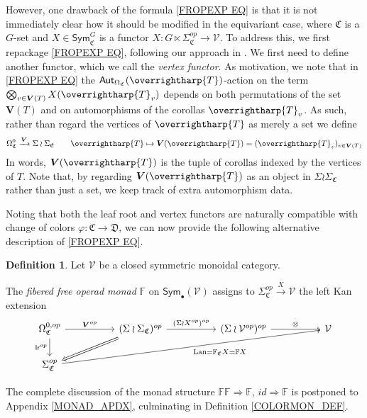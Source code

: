\documentclass[a4paper,10pt
,draft
]{article}%
\numberwithin{equation}{section}
\numberwithin{figure}{section}
\theoremstyle{definition} %
\newtheorem{definition}[equation]{Definition}%
\newcommand{\vect}[1]{\text{\overrightharp{\ensuremath{#1}}}}
\DeclareMathOperator{\Lan}{Lan}%
\newcommand{\V}{\ensuremath{\mathcal V}}
\newcommand{\1}{\ensuremath{\mathbbm 1}}%
\begin{document}
However, one drawback of the formula  
\eqref{FROPEXP EQ}
is that it is not immediately clear how it should be modified 
in the equivariant case,
where $\mathfrak{C}$ is a $G$-set
and $X \in \mathsf{Sym}^G_{\mathfrak{C}}$
is a functor 
$X \colon G \ltimes \Sigma_{\mathfrak{C}}^{op} \to \V$.
To address this, we first repackage \eqref{FROPEXP EQ}, 
following our approach in \cite[\S 4]{BP_geo}.
We first need to define another functor, which we call the \emph{vertex functor}.
As motivation, we note that
in \eqref{FROPEXP EQ}
the $\mathsf{Aut}_{\Omega_{\mathfrak{C}}}(\vect{T})$-action
on the term
$\bigotimes_{v \in \boldsymbol{V}(T)} X(\vect{T}_v)$
depends on both permutations 
of the set $\boldsymbol{V}(T)$
and on automorphisms of the corollas $\vect{T}_v$.
As such, rather than regard the vertices of $\vect{T}$ as merely a set
we define 
\begin{equation}\label{VFUNDEF EQ}
\Omega_{\mathfrak{C}}^0 \xrightarrow{\boldsymbol{V}} \Sigma \wr \Sigma_{\mathfrak{C}}
\qquad 
\vect{T} \mapsto 
\boldsymbol{V}(\vect{T})=(\vect{T}_v )_{v \in \boldsymbol{V}(T)}
\end{equation}
In words, $\boldsymbol{V}(\vect{T})$
is the tuple of corollas indexed by the vertices of $T$. 
Note that,
by regarding $\boldsymbol{V}(\vect{T})$ as an object in 
$\Sigma \wr \Sigma_{\mathfrak{C}}$ rather than just a set,
we keep track of extra automorphism data.

Noting that both the leaf root and vertex functors are naturally compatible with change of colors 
$\varphi \colon \mathfrak{C} \to \mathfrak{D}$, 
we can now provide the following alternative 
description of \eqref{FROPEXP EQ}.



\begin{definition}\label{FREEOP DEF}
	Let $\mathcal{V}$ be a closed symmetric monoidal category.
	
	The \textit{fibered free operad monad} $\mathbb{F}$ on $\mathsf{Sym}_\bullet(\mathcal{V})$ 
	assigns to 
	$\Sigma_{\mathfrak{C}}^{op} \xrightarrow{X} \mathcal{V}$
	the left Kan extension
	\begin{equation}\label{FREEOP_EQ}
	\begin{tikzcd}[column sep = 50pt]
	\Omega^{0,op}_{\mathfrak{C}}
	\arrow[d, "\mathsf{lr}^{op}"']
	\arrow[r, "\boldsymbol{V}^{op}"]
	&
	(\Sigma \wr \Sigma_{\mathfrak{C}})^{op} \arrow[r, "(\Sigma \wr X^{op})^{op}"]
	\arrow[dl, Rightarrow]
	&
	(\Sigma \wr \V^{op})^{op} \arrow[r, "\otimes"]
	&
	\V
	\\
	\Sigma^{op}_{\mathfrak{C}}
	\arrow[urrr, "\Lan = \mathbb F_{\mathfrak{C}} X = \mathbb F X"']
	\end{tikzcd}
	\end{equation}
\end{definition}
The complete discussion of the monad structure
$\mathbb{F}\mathbb{F} \Rightarrow \mathbb{F}$,
$id \Rightarrow \mathbb{F}$ is postponed to Appendix \ref{MONAD_APDX},
culminating in Definition \ref{COLORMON_DEF}.
\end{document}
